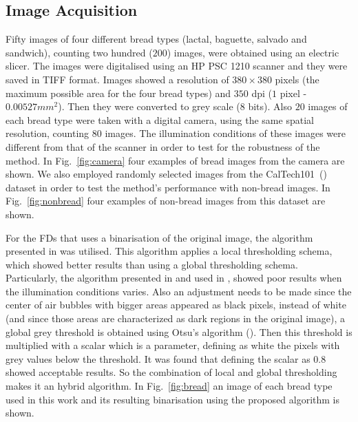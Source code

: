 \documentclass[oneside,a4paper,english,links]{amca}
\begin{document}
\subsection{Image Acquisition}
Fifty images of four different bread types (lactal, baguette, salvado and sandwich), counting two hundred ($200$) images, were obtained using an electric slicer. The images were digitalised using an HP PSC 1210 scanner and they were saved in TIFF format. Images showed a resolution of $380 \times 380$ pixels (the maximum possible area for the four bread types) and $350$ dpi ($1$ pixel - $0.00527 mm^{2}$). Then they were converted to grey scale ($8$ bits). Also $20$ images of each bread type were taken with a digital camera, using the same spatial resolution, counting $80$ images. The illumination conditions of these images were different from that of the scanner in order to test for the robustness of the method. In Fig.~\ref{fig:camera} four examples of bread images from the camera are shown. We also employed randomly selected images from the CalTech101~(\cite{FeiFei04}) dataset in order to test the method's performance with non-bread images. In Fig.~\ref{fig:nonbread} four examples of non-bread images from this dataset are shown. 

For the FDs that uses a binarisation of the original image, the algorithm presented in \cite{White83} was utilised. This algorithm applies a local thresholding schema, which showed better results than using a global thresholding schema. Particularly, the algorithm presented in \cite{Huang95} and used in \cite{Gonzales2008}, showed poor results when the illumination conditions varies. Also an adjustment needs to be made since the center of air bubbles with bigger areas appeared as black pixels, instead of white (and since those areas are characterized as dark regions in the original image), a global grey threshold is obtained using Otsu's algorithm (\cite{Otsu79}). Then this threshold is multiplied with a scalar which is a parameter, defining as white the pixels with grey values below the threshold. It was found that defining the scalar as $0.8$ showed acceptable results. So the combination of local and global thresholding makes it an hybrid algorithm. In Fig.~\ref{fig:bread} an image of each bread type used in this work and its resulting binarisation using the proposed algorithm is shown.  
\end{document}
